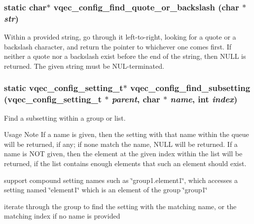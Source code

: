 \subsubsection{\setlength{\rightskip}{0pt plus 5cm}static char$\ast$ vqec\_\-config\_\-find\_\-quote\_\-or\_\-backslash (char $\ast$ {\em str})\hspace{0.3cm}{\tt  [static]}}\label{vqec__config__parser_8c_4fc3efb07ee90b55056d3a6f159ef435}


Within a provided string, go through it left-to-right, looking for a quote or a backslash character, and return the pointer to whichever one comes first. If neither a quote nor a backslash exist before the end of the string, then NULL is returned. The given string must be NUL-terminated. 
\subsubsection{\setlength{\rightskip}{0pt plus 5cm}static \bf{vqec\_\-config\_\-setting\_\-t}$\ast$ vqec\_\-config\_\-find\_\-subsetting (\bf{vqec\_\-config\_\-setting\_\-t} $\ast$ {\em parent}, char $\ast$ {\em name}, int {\em index})\hspace{0.3cm}{\tt  [static]}}\label{vqec__config__parser_8c_091a95700eb0dc6d54a133198b30d7e3}


Find a subsetting within a group or list.

Usage Note If a name is given, then the setting with that name within the queue will be returned, if any; if none match the name, NULL will be returned. If a name is NOT given, then the element at the given index within the list will be returned, if the list contains enough elements that such an element should exist. 

support compound setting names such as \char`\"{}group1.element1\char`\"{}, which accesses a setting named \char`\"{}element1\char`\"{} which is an element of the group \char`\"{}group1\char`\"{}

iterate through the group to find the setting with the matching name, or the matching index if no name is provided 
